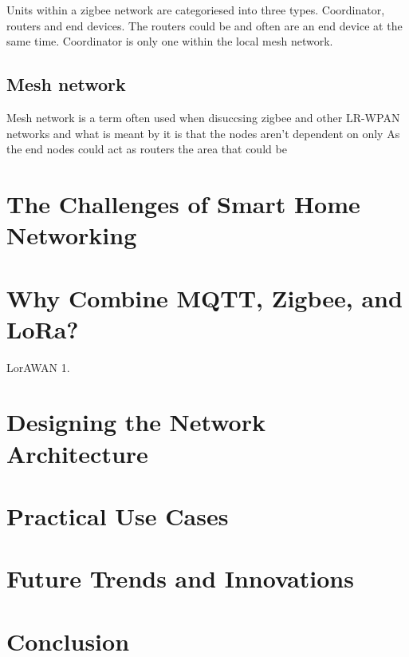 \documentclass[article,a4paper]{IEEEtran}
\begin{document}
    \newline\newline
    Units within a zigbee network are categoriesed into three types. Coordinator, routers and end devices. The routers could be and often are an end device at the same time. Coordinator is only one within the local mesh network.  

    \subsection{Mesh network}
    Mesh network is a term often used when disuccsing zigbee and other LR-WPAN networks and what is meant by it is that the nodes aren't dependent on only As the end nodes could act as routers the area that could be  

    \section{The Challenges of Smart Home Networking}

    \section{Why Combine MQTT, Zigbee, and LoRa?}

    LorAWAN
    1. 

    \section{Designing the Network Architecture}

    \section{Practical Use Cases}

    \section{Future Trends and Innovations}

    \section{Conclusion}

\printbibliography
\end{document}
